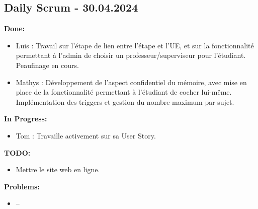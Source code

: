 \documentclass[11pt]{article}
\begin{document}
\subsection*{{\color{navy}Daily Scrum - 30.04.2024}}

\textbf{Done:}
\begin{itemize}
  \item Luis : Travail sur l'étape de lien entre l'étape et l'UE, et sur la fonctionnalité permettant à l'admin de choisir un professeur/superviseur pour l'étudiant. Peaufinage en cours.
  \item Mathys : Développement de l'aspect confidentiel du mémoire, avec mise en place de la fonctionnalité permettant à l'étudiant de cocher lui-même. Implémentation des triggers et gestion du nombre maximum par sujet.
\end{itemize}

\textbf{In Progress:}
\begin{itemize}
  \item Tom : Travaille activement sur sa User Story.
\end{itemize}

\textbf{TODO:}
\begin{itemize}
  \item Mettre le site web en ligne.
\end{itemize}

\textbf{Problems:}
\begin{itemize}
  \item --
\end{itemize}
\end{document}
